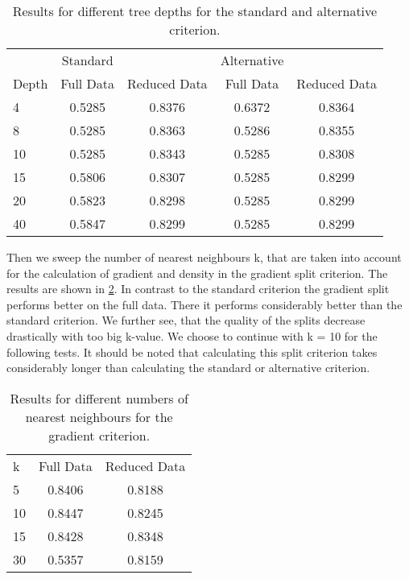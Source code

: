 \documentclass{article}
\begin{document}
\begin{table}[h]
	\centering
	\begin{tabular}{l c c c c}
				&   Standard  &					& 	Alternative	&				\\
		Depth	&	Full Data & Reduced Data	& 	Full Data	& Reduced Data	\\
		  4		&	0.5285	  &	0.8376			&	0.6372		&	0.8364		\\
		  8 	& 	0.5285	  & 0.8363			&	0.5286		&	0.8355		\\
		  10	&   0.5285	  & 0.8343			&	0.5285		&	0.8308		\\
		  15	& 	0.5806	  & 0.8307			&	0.5285		&	0.8299		\\
		  20	&   0.5823	  & 0.8298			&	0.5285		&	0.8299		\\
		  40	&	0.5847	  & 0.8299			&	0.5285		&	0.8299		\\
	\end{tabular}
	\caption{Results for different tree depths for the standard and alternative criterion.}
	\label{tab3}
\end{table}

Then we sweep the number of nearest neighbours k, that are taken into account for the calculation 
of gradient and density in the gradient split criterion.
\newline
The results are shown in \ref{tab4}. In contrast to the standard criterion the gradient split 
performs better on the full data. There it performs considerably better than the standard criterion.
We further see, that the quality of the splits decrease drastically with too big k-value.
We choose to continue with k = 10 for the following tests.
\newline
It should be noted that calculating this split criterion takes considerably longer than calculating
the standard or alternative criterion.

\begin{table}[h]
	\centering
	\begin{tabular}{l c c}
		  k		&	Full Data & Reduced Data	\\
		  5		&	0.8406	  &	0.8188			\\
	 	  10 	& 	0.8447	  & 0.8245			\\
		  15	&   0.8428	  & 0.8348			\\
		  30	& 	0.5357	  & 0.8159			\\
	\end{tabular}
	\caption{Results for different numbers of nearest neighbours for the gradient criterion.}
	\label{tab4}
\end{table}
\end{document}

